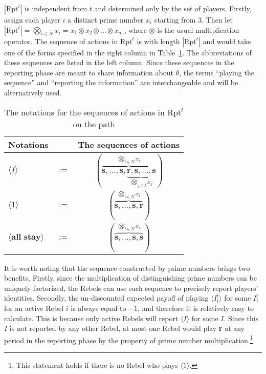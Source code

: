 \documentclass[12pt,letter]{article}
\newcommand{\Omicron}{\mathrm{Rpt}}
\theoremstyle{definition}
\theoremstyle{remark}
\theoremstyle{claim}
\begin{document}
$|\Omicron^{t}|$ is independent from $t$ and determined only by the set of players. Firstly, assign each player $i$ a distinct prime number $x_i$ starting from $3$. Then let $|\Omicron^{t}|=\bigotimes_{i\in N} x_i=x_1\otimes x_2\otimes...\otimes x_n$ , where $\otimes$ is the usual multiplication operator. The sequence of actions in $\Omicron^{t}$ is with length $|\Omicron^t|$ and would take one of the forms specified in the right column in Table~\ref{Table_msg_form}. The abbreviations of these sequences are listed in the left column. Since these sequences in the reporting phase are meant to share information about $\theta$, the terms ``playing the sequence'' and ``reporting the information'' are interchangeable and will be alternatively used.


\begin{table}[!htbp]
\caption{The notations for the sequences of actions in $\Omicron^t$ on the path}
\label{Table_msg_form}
\begin{center}
\begin{tabular}{l c c}
Notations && The sequences of actions\\
\hline
\hline
$\langle  I \rangle$ 				& $:=$ 			& $(\overbrace{\textbf{s},...,\textbf{s},\underbrace{\textbf{r},\textbf{s},...,\textbf{s}}_{\bigotimes_{j\in I}x_j} }^{\bigotimes_{i\in N} x_i})$  \\
$\langle 1 \rangle$	 					& $:=$ 			& $( \overbrace{\textbf{s},...,\textbf{s},{\textbf{r}} }^{\bigotimes_{i\in N} x_i} )$  \\
$\langle \textbf{all stay} \rangle$	 					& $:=$ 			& $(\overbrace{ \textbf{s},...,\textbf{s},{\textbf{s}} }^{\bigotimes_{i\in N} x_i})$  \\
\hline
\end{tabular}
\end{center}
\end{table}


It is worth noting that the sequence constructed by prime numbers brings two benefits. Firstly, since the multiplication of distinguishing prime numbers can be uniquely factorized, the Rebels can use such sequence to precisely report players' identities. Secondly, the un-discounted expected payoff of playing $\langle I^t_i \rangle$ for some $I^t_i$ for an active Rebel $i$ is always equal to $-1$, and therefore it is relatively easy to calculate. This is because only active Rebels will report $\langle I \rangle$ for some $I$. Since this $I$ is not reported by any other Rebel, at most one Rebel would play \textbf{r} at any period in the reporting phase by the property of prime number multiplication.\footnote{This statement holds if there is no Rebel who plays $\langle 1 \rangle$.} 
\end{document}
